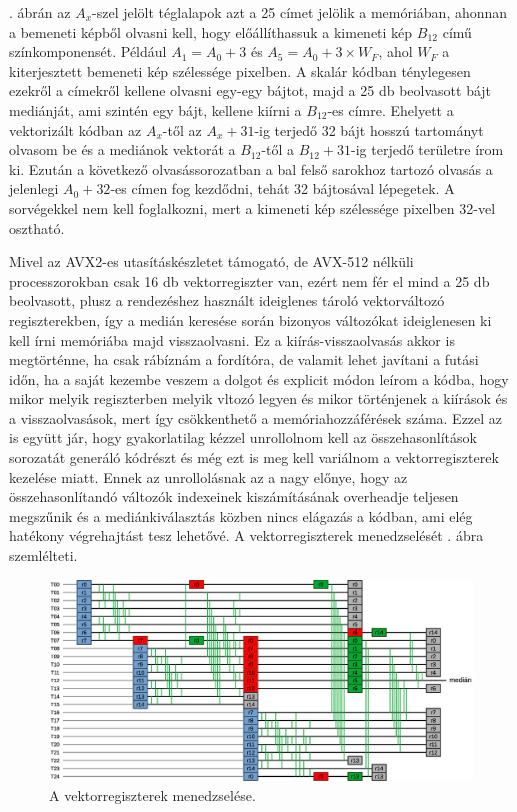 			. ábrán az $A_x$-szel jelölt téglalapok azt a 25 címet jelölik a memóriában, ahonnan a bemeneti képből olvasni kell, hogy előállíthassuk a kimeneti kép $B_{12}$ című színkomponensét. Például $A_1=A_0+3$ és $A_5=A_0+3\times W_F$, ahol $W_F$ a kiterjesztett bemeneti kép szélessége pixelben. A skalár kódban ténylegesen ezekről a címekről kellene olvasni egy-egy bájtot, majd a 25 db beolvasott bájt mediánját, ami szintén egy bájt, kellene kiírni a $B_{12}$-es címre. Ehelyett a vektorizált kódban az $A_x$-től az $A_{x}+31$-ig terjedő 32 bájt hosszú tartományt olvasom be és a mediánok vektorát a $B_{12}$-től a $B_{12}+31$-ig terjedő területre írom ki. Ezután a következő olvasássorozatban a bal felső sarokhoz tartozó olvasás a jelenlegi $A_0+32$-es címen fog kezdődni, tehát 32 bájtosával lépegetek. A sorvégekkel nem kell foglalkozni, mert a kimeneti kép szélessége pixelben 32-vel osztható.

			Mivel az AVX2-es utasításkészletet támogató, de AVX-512 nélküli processzorokban csak 16 db vektorregiszter van, ezért nem fér el mind a 25 db beolvasott, plusz a rendezéshez használt ideiglenes tároló vektorváltozó regiszterekben, így a medián keresése során bizonyos változókat ideiglenesen ki kell írni memóriába majd visszaolvasni. Ez a kiírás-visszaolvasás akkor is megtörténne, ha csak rábíznám a fordítóra, de valamit lehet javítani a futási időn, ha a saját kezembe veszem a dolgot és explicit módon leírom a kódba, hogy mikor melyik regiszterben melyik vltozó legyen és mikor történjenek a kiírások és a visszaolvasások, mert így csökkenthető a memóriahozzáférések száma. Ezzel az is együtt jár, hogy gyakorlatilag kézzel unrollolnom kell az összehasonlítások sorozatát generáló kódrészt és még ezt is meg kell variálnom a vektorregiszterek kezelése miatt. Ennek az unrollolásnak az a nagy előnye, hogy az összehasonlítandó változók indexeinek kiszámításának overheadje teljesen megszűnik és a mediánkiválasztás közben nincs elágazás a kódban, ami elég hatékony végrehajtást tesz lehetővé. A vektorregiszterek menedzselését . ábra szemlélteti.

			\begin{figure}[h]
				\centering
				\includegraphics[width=\textwidth]{kep/vektorregiszterek.eps}
				\caption{A vektorregiszterek menedzselése.}
				\label{fig:vektorregiszterek}
			\end{figure}

